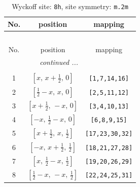 \documentclass[fleqn,8pt]{jsarticle}
\begin{document}
\begin{longtable}{ccc}
\caption{Wyckoff site: {\tt 8h}, site symmetry: {\tt m.2m}}
 \\
 \hline \hline
No. & position & mapping \\ \hline \endfirsthead

\multicolumn{2}{l}{\tablename\ \thetable{}} \\
 \hline \hline
No. & position & mapping \\ \hline \endhead

 \hline \hline
\multicolumn{2}{r}{\footnotesize\it continued ...} \\ \endfoot

 \hline \hline
\multicolumn{2}{r}{} \\ \endlastfoot

1 & $\left[ x,\, x + \frac{1}{2},\, 0 \right]$ & {\tt [1,7,14,16]} \\ \hline
2 & $\left[ \frac{1}{2} - x,\, x,\, 0 \right]$ & {\tt [2,5,11,12]} \\ \hline
3 & $\left[ x + \frac{1}{2},\, - x,\, 0 \right]$ & {\tt [3,4,10,13]} \\ \hline
4 & $\left[ - x,\, \frac{1}{2} - x,\, 0 \right]$ & {\tt [6,8,9,15]} \\ \hline
5 & $\left[ x + \frac{1}{2},\, x,\, \frac{1}{2} \right]$ & {\tt [17,23,30,32]} \\ \hline
6 & $\left[ - x,\, x + \frac{1}{2},\, \frac{1}{2} \right]$ & {\tt [18,21,27,28]} \\ \hline
7 & $\left[ x,\, \frac{1}{2} - x,\, \frac{1}{2} \right]$ & {\tt [19,20,26,29]} \\ \hline
8 & $\left[ \frac{1}{2} - x,\, - x,\, \frac{1}{2} \right]$ & {\tt [22,24,25,31]} \\
\end{longtable}
\renewcommand{\arraystretch}{1.2}
\end{document}
